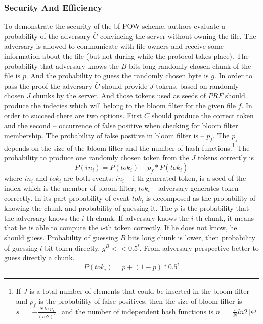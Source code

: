\documentclass[12pt]{article}
\begin{document}
\subsubsection{Security And Efficiency}
\label{subsub:secAndeff6}


To demonstrate the security of the bf-POW scheme, authors evaluate a probability of the adversary $\bar{C}$ convincing the server without owning the file. The adversary is allowed to communicate with file owners and receive some information about the file (but not during while the protocol takes place). The probability that adversary knows the $B$ bits long randomly chosen chunk of the file is $p$. And the probability to guess the randomly chosen byte is $g$. In order to pass the proof the adversary $\bar{C}$ should provide $J$ tokens, based on randomly chosen $J$ chunks by the server. And those tokens used as seeds of $PRF$ should produce the indecies which will belong to the bloom filter for the given file $f$. In order to succeed there are two options. First $\bar{C}$ should produce the correct token and the second -- occurrence of false positive when checking for bloom filter membership. The probability of false positive in bloom filter is -- $p_f$. The $p_f$ depends on the size of the bloom filter and the number of hash functions.\footnote{If $J$ is a total number of elements that could be inserted in the bloom filter and $p_f$ is the probability of false positives, then the size of bloom filter is $s=\lceil - \frac {N\ ln\ p_f} {(ln2)^2}\rceil$ and the number of independent hash functions is $n=\lceil\frac{s} {N}ln2\rceil$} The probability to produce one randomly chosen token from the $J$ tokens correctly is 
\begin{equation}\label{1}
P(in_i)=P(tok_i)+p_f*P(\bar{tok_i})
\end{equation}
where $in_i$ and $tok_i$ are both events: $in_i$ --  i-th generated token, is a seed of the index which is the member of bloom filter; $tok_i$ -- adversary generates token correctly. In its part probability of event $tok_i$ is decomposed as the probability of knowing the chunk and probability of guessing it. The $p$ is the probability that the adversary knows the $i$-th chunk.  If adversary knows the $i$-th chunk, it means that he is able to compute the $i$-th token correctly. If he does not know, he should guess. Probability of guessing $B$ bits long chunk is lower, then probability of guessing $l$ bit token directly, $g^B << 0.5^l$. From adversary perspective better to guess directly a chunk. 
\begin{equation}\label{2}
P(tok_i)=p+(1-p)*0.5^l
\end{equation}
\end{document}
